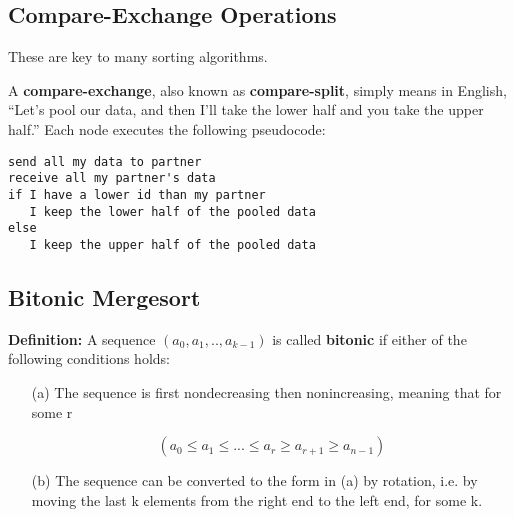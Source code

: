 % 
% 

\subsection{Compare-Exchange Operations}
\label{compareexchange}

These are key to many sorting algorithms.

A {\bf compare-exchange}, also known as {\bf compare-split}, simply
means in English, ``Let's pool our data, and then I'll take the lower
half and you take the upper half.''  Each node executes the following
pseudocode:

\begin{Verbatim}[fontsize=\relsize{-2}]
send all my data to partner
receive all my partner's data 
if I have a lower id than my partner
   I keep the lower half of the pooled data 
else
   I keep the upper half of the pooled data 
\end{Verbatim}

\subsection{Bitonic Mergesort}

{\bf Definition:}
A sequence $(a_0, a_1,.., a_{k-1})$ is called {\bf bitonic} if either of
the following conditions holds:

\begin{itemize}

\item [(a)] The sequence is first nondecreasing then nonincreasing,
meaning that for some r

$$
(a_0 \leq a_1 \leq ... \leq a_r \geq a_{r+1} \geq a_{n-1})
$$

\item [(b)] The sequence can be converted to the form in (a) by
rotation, i.e. by moving the last k elements from the right end to the
left end, for some k. 

\end{itemize}

